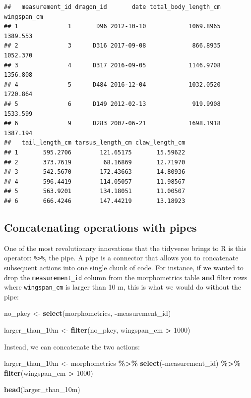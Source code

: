 \documentclass[
]{book}
\newenvironment{Shaded}{\begin{snugshade}}{\end{snugshade}}
\newcommand{\DecValTok}[1]{\textcolor[rgb]{0.00,0.00,0.81}{#1}}
\newcommand{\FunctionTok}[1]{\textcolor[rgb]{0.13,0.29,0.53}{\textbf{#1}}}
\newcommand{\NormalTok}[1]{#1}
\newcommand{\OtherTok}[1]{\textcolor[rgb]{0.56,0.35,0.01}{#1}}
\newcommand{\SpecialCharTok}[1]{\textcolor[rgb]{0.81,0.36,0.00}{\textbf{#1}}}
\begin{document}
\begin{verbatim}
##   measurement_id dragon_id       date total_body_length_cm wingspan_cm
## 1              1       D96 2012-10-10            1069.8965    1389.553
## 2              3      D316 2017-09-08             866.8935    1052.370
## 3              4      D317 2016-09-05            1146.9708    1356.808
## 4              5      D484 2016-12-04            1032.0520    1720.864
## 5              6      D149 2012-02-13             919.9908    1533.599
## 6              9      D283 2007-06-21            1698.1918    1387.194
##   tail_length_cm tarsus_length_cm claw_length_cm
## 1       595.2706        121.65175       15.59622
## 2       373.7619         68.16869       12.71970
## 3       542.5670        172.43663       14.80936
## 4       596.4419        114.05057       11.98567
## 5       563.9201        134.18051       11.00507
## 6       666.4246        147.44219       13.18923
\end{verbatim}

\hypertarget{concatenating-operations-with-pipes}{%
\subsection{Concatenating operations with pipes}\label{concatenating-operations-with-pipes}}

One of the most revolutionary innovations that the tidyverse brings to R is this
operator: \texttt{\%\textgreater{}\%}, the pipe. A pipe is a connector that allows you to concatenate
subsequent actions into one single chunk of code. For instance, if we wanted to
drop the \texttt{measurement\_id} column from the morphometrics table \textbf{and} filter
rows where \texttt{wingspan\_cm} is larger than 10 m, this is what we would do without
the pipe:

\begin{Shaded}
\begin{Highlighting}[]
\NormalTok{no\_pkey }\OtherTok{\textless{}{-}} \FunctionTok{select}\NormalTok{(morphometrics, }\SpecialCharTok{{-}}\NormalTok{measurement\_id)}

\NormalTok{larger\_than\_10m }\OtherTok{\textless{}{-}} \FunctionTok{filter}\NormalTok{(no\_pkey, wingspan\_cm }\SpecialCharTok{\textgreater{}} \DecValTok{1000}\NormalTok{)}
\end{Highlighting}
\end{Shaded}

Instead, we can concatenate the two actions:

\begin{Shaded}
\begin{Highlighting}[]
\NormalTok{larger\_than\_10m }\OtherTok{\textless{}{-}}\NormalTok{ morphometrics }\SpecialCharTok{\%\textgreater{}\%} 
  \FunctionTok{select}\NormalTok{(}\SpecialCharTok{{-}}\NormalTok{measurement\_id) }\SpecialCharTok{\%\textgreater{}\%} 
  \FunctionTok{filter}\NormalTok{(wingspan\_cm }\SpecialCharTok{\textgreater{}} \DecValTok{1000}\NormalTok{)}

\FunctionTok{head}\NormalTok{(larger\_than\_10m) }
\end{Highlighting}
\end{Shaded}
\end{document}
